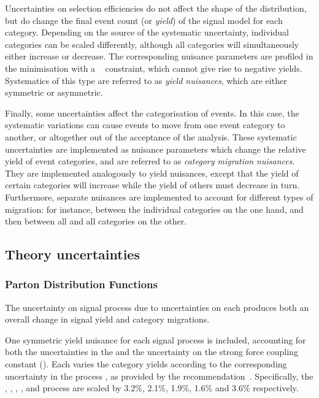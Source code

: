 Uncertainties on selection efficiencies do not affect the shape of the \mgg distribution, but do change the final event count (or \emph{yield}) of the signal model for each category. Depending on the source of the systematic uncertainty, individual categories can be scaled differently, although all categories will simultaneously either increase or decrease. The corresponding nuisance parameters are profiled in the \NLL minimisation with a \lnN~\cite{1987lognormal} constraint, which cannot give rise to negative yields. Systematics of this type are referred to as \emph{yield nuisances}, which are either symmetric or asymmetric. %

Finally, some uncertainties affect the categorisation of events. In this case, the systematic variations can cause events to move from one event category to another, or altogether out of the acceptance of the analysis. These systematic uncertainties are implemented as nuisance parameters which change the relative yield of event categories, and are referred to as \emph{category migration nuisances}. They are implemented analogously to yield nuisances, except that the yield of certain categories will increase while the yield of others must decrease in turn. Furthermore, separate nuisances are implemented to account for different types of migration: for instance, between the individual \VBFTag categories on the one hand, and then between all \VBFTag and all \Untagged categories on the other.


\subsection{Theory uncertainties}
\subsubsection{Parton Distribution Functions}

The uncertainty on signal process \crosssection\s due to uncertainties on each \PDF produces both an overall change in signal yield and category migrations.

One symmetric yield nuisance for each signal process is included, accounting for both the uncertainties in the \PDF\s and the uncertainty on the strong force coupling constant (\alphaS). Each varies the category yields according to the corresponding uncertainty in the process \crosssection, as provided by the \LHCHXSWG recommendation~\cite{LHCHXSWGYR4}. Specifically, the \ggH, \VBF, \WH, \ZH, and \ttH process \crosssection\s are scaled by 3.2\%, 2.1\%, 1.9\%, 1.6\% and 3.6\% respectively. 


